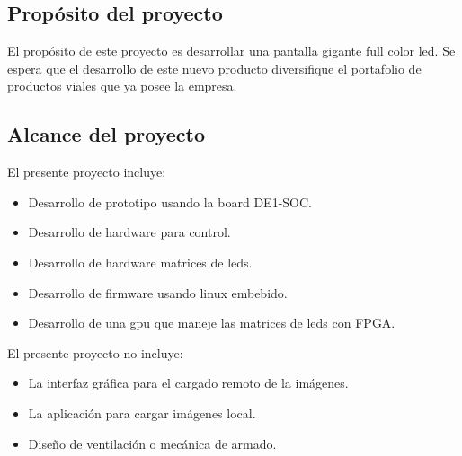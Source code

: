\subsection{Propósito del proyecto}
El propósito de este proyecto es desarrollar una pantalla gigante full color led. Se espera que el desarrollo de este nuevo producto diversifique el portafolio de productos viales que ya posee la empresa.
\subsection{Alcance del proyecto}
El presente proyecto incluye:

\begin{itemize}
\item Desarrollo de prototipo usando la board DE1-SOC.
\item Desarrollo de hardware para control.
\item Desarrollo de hardware matrices de leds.
\item Desarrollo de firmware usando linux embebido.
\item Desarrollo de una gpu que maneje las matrices de leds con FPGA.
\end{itemize}

El presente proyecto no incluye:

 \begin{itemize}
\item La interfaz gráfica para el cargado remoto de la imágenes.
\item La aplicación para cargar imágenes local.
\item Diseño de ventilación o mecánica de armado.

\end{itemize}




